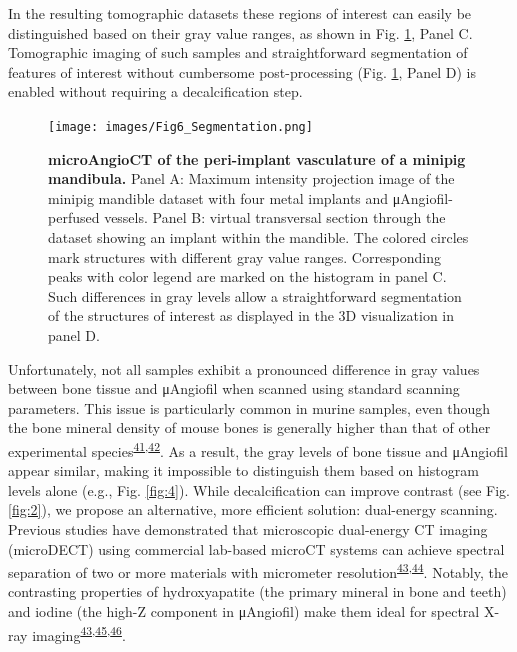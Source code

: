 In the resulting tomographic datasets these regions of interest can easily be distinguished based on their gray value ranges, as shown in Fig. \ref{fig:6}, Panel C.
Tomographic imaging of such samples and straightforward segmentation of features of interest without cumbersome post-processing (Fig. \ref{fig:6}, Panel D) is enabled without requiring a decalcification step.

\begin{figure}
\hypertarget{fig:6}{%
\centering
\texttt{[image: images/Fig6\_Segmentation.png]}
\caption{\textbf{microAngioCT of the peri-implant vasculature of a minipig mandibula.}
Panel A: Maximum intensity projection image of the minipig mandible dataset with four metal implants and μAngiofil-perfused vessels.
Panel B: virtual transversal section through the dataset showing an implant within the mandible.
The colored circles mark structures with different gray value ranges.
Corresponding peaks with color legend are marked on the histogram in panel C.
Such differences in gray levels allow a straightforward segmentation of the structures of interest as displayed in the 3D visualization in panel D.}\label{fig:6}
}
\end{figure}

Unfortunately, not all samples exhibit a pronounced difference in gray values between bone tissue and μAngiofil when scanned using standard scanning parameters.
This issue is particularly common in murine samples, even though the bone mineral density of mouse bones is generally higher than that of other experimental species\textsuperscript{\protect\hyperlink{ref-FXSWRzX2}{41},\protect\hyperlink{ref-1AEVcopFo}{42}}.
As a result, the gray levels of bone tissue and μAngiofil appear similar, making it impossible to distinguish them based on histogram levels alone (e.g., Fig. \ref{fig:4}).
While decalcification can improve contrast (see Fig. \ref{fig:2}), we propose an alternative, more efficient solution: dual-energy scanning.
Previous studies have demonstrated that microscopic dual-energy CT imaging (microDECT) using commercial lab-based microCT systems can achieve spectral separation of two or more materials with micrometer resolution\textsuperscript{\protect\hyperlink{ref-191glo5Hi}{43},\protect\hyperlink{ref-w1AGMK3j}{44}}.
Notably, the contrasting properties of hydroxyapatite (the primary mineral in bone and teeth) and iodine (the high-Z component in μAngiofil) make them ideal for spectral X-ray imaging\textsuperscript{\protect\hyperlink{ref-191glo5Hi}{43},\protect\hyperlink{ref-ZKU6zNgr}{45},\protect\hyperlink{ref-oRhGUhqB}{46}}.

